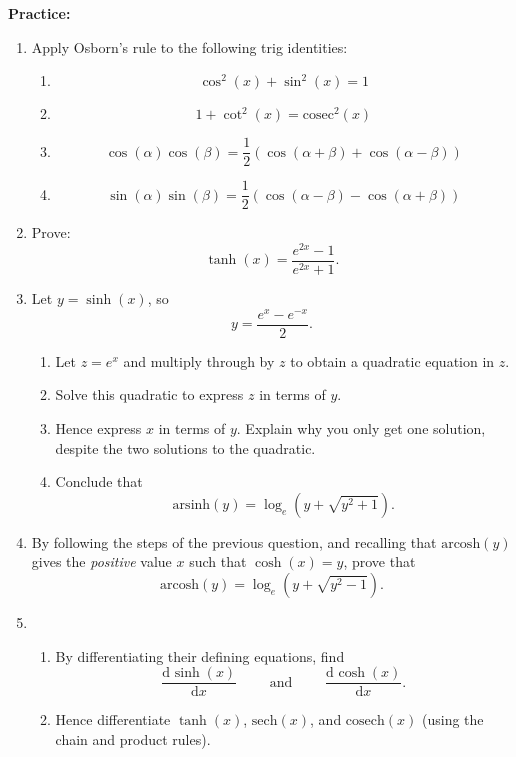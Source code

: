 \documentclass{article}
\newcommand{\deriv}[3][]{\frac{\mathrm{d}^{#1} #2}{\mathrm{d}#3^{#1}}}
\newcommand{\sech}{\mathrm{sech}}
\newcommand{\cosech}{\mathrm{cosech}}
\newcommand{\arsinh}{\mathrm{arsinh}}
\newcommand{\arcosh}{\mathrm{arcosh}}
\newcommand{\cosec}{\mathrm{cosec}}
\begin{document}
\clearpage

\textbf{Practice:}


\begin{enumerate}
	\item Apply Osborn's rule to the following trig identities:
		\begin{enumerate}
			\item \[\cos^2(x)+\sin^2(x)=1\]
			\item \[1+\cot^2(x)=\cosec^2(x)\]
			\item \[\cos(\alpha)\cos(\beta)=\frac{1}{2}\left(\cos(\alpha+\beta)+\cos(\alpha-\beta)\right)\]
			\item \[\sin(\alpha)\sin(\beta)=\frac{1}{2}\left(\cos(\alpha-\beta)-\cos(\alpha+\beta)\right)\]
		\end{enumerate}
	\item Prove:
		\[\tanh(x)=\frac{e^{2x}-1}{e^{2x}+1}.\]
	\item Let $y=\sinh(x)$, so
		\[y=\frac{e^x-e^{-x}}{2}.\]
		\begin{enumerate}
			\item Let $z=e^x$ and multiply through by $z$ to obtain a quadratic equation in $z$.
			\item Solve this quadratic to express $z$ in terms of $y$.
			\item Hence express $x$ in terms of $y$. Explain why you only get one solution, despite the two solutions to the quadratic.
			\item Conclude that
				\[\arsinh(y)=\log_e\left(y+ \sqrt{y^2+1}\right).\]
		\end{enumerate}
	\item By following the steps of the previous question, and recalling that $\arcosh(y)$ gives the \textit{positive} value $x$ such that $\cosh(x)=y$, prove that
		\[\arcosh(y)=\log_e\left(y+\sqrt{y^2-1}\right).\]
	\item
		\begin{enumerate}
			\item By differentiating their defining equations, find
				\[\deriv{\sinh(x)}{x}\qquad\mbox{ and }\qquad \deriv{\cosh(x)}{x}.\]
			\item Hence differentiate $\tanh(x)$, $\sech(x)$, and $\cosech(x)$ (using the chain and product rules).
		\end{enumerate}
\end{enumerate}
\end{document}
